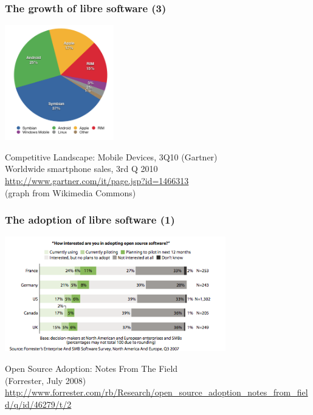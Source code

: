
\begin{frame}
\frametitle{The growth of libre software (3)}

\includegraphics[height=5cm]{smartphone-share-gartner-2010-q3}

\begin{flushright}
Competitive Landscape: Mobile Devices, 3Q10 (Gartner)\\
Worldwide smartphone sales, 3rd Q 2010 \\
{\small \url{http://www.gartner.com/it/page.jsp?id=1466313}} \\
(graph from Wikimedia Commons)
\end{flushright}
\end{frame}



\begin{frame}
\frametitle{The adoption of libre software (1)}

\includegraphics[height=5cm]{adoption-interest-forrester-2007-q3}

\begin{flushright}
Open Source Adoption: Notes From The Field \\
(Forrester, July 2008) \\
{\small \url{http://www.forrester.com/rb/Research/open_source_adoption_notes_from_field/q/id/46279/t/2}} 
\end{flushright}
\end{frame}

